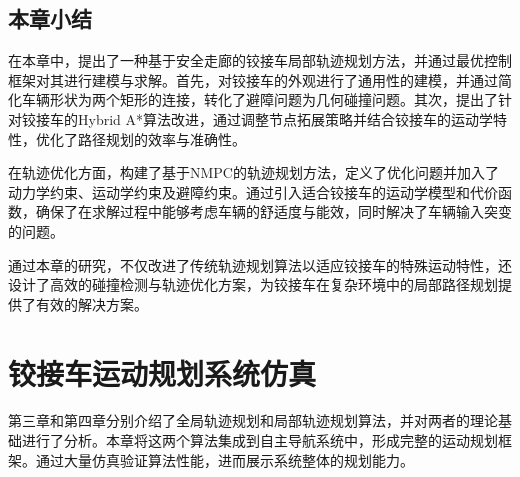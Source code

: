 \documentclass[master,academic]{ysuthesis} %
\begin{document}
	\section{本章小结}
	在本章中，提出了一种基于安全走廊的铰接车局部轨迹规划方法，并通过最优控制框架对其进行建模与求解。首先，对铰接车的外观进行了通用性的建模，并通过简化车辆形状为两个矩形的连接，转化了避障问题为几何碰撞问题。其次，提出了针对铰接车的Hybrid A*算法改进，通过调整节点拓展策略并结合铰接车的运动学特性，优化了路径规划的效率与准确性。

	在轨迹优化方面，构建了基于NMPC的轨迹规划方法，定义了优化问题并加入了动力学约束、运动学约束及避障约束。通过引入适合铰接车的运动学模型和代价函数，确保了在求解过程中能够考虑车辆的舒适度与能效，同时解决了车辆输入突变的问题。

	通过本章的研究，不仅改进了传统轨迹规划算法以适应铰接车的特殊运动特性，还设计了高效的碰撞检测与轨迹优化方案，为铰接车在复杂环境中的局部路径规划提供了有效的解决方案。
	
	\chapter{铰接车运动规划系统仿真}
	第三章和第四章分别介绍了全局轨迹规划和局部轨迹规划算法，并对两者的理论基础进行了分析。本章将这两个算法集成到自主导航系统中，形成完整的运动规划框架。通过大量仿真验证算法性能，进而展示系统整体的规划能力。
	
\end{document}
